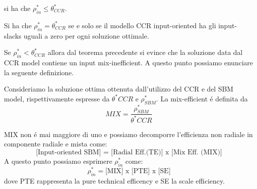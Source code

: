 si ha che $\rho^*_{in} \leq \theta^*_{CCR}$.

\begin{teor} Si ha che $\rho^*_{in} = \theta^*_{CCR}$ se e solo se il modello CCR input-oriented ha gli input-slacks uguali a zero per ogni soluzione ottimale. 
\end{teor}
\begin{oss} Se $\rho^*_{in} < \theta^*_{CCR}$ allora dal teorema precedente si evince che la soluzione data dal CCR model contiene un input mix-inefficient. A questo punto possiamo enunciare la seguente definizione.
\end{oss}
\begin{definiz} Consideriamo la soluzione ottima ottenuta dall'utilizzo del CCR e del SBM model, rispettivamente espresse da $\theta^*{CCR}$ e $\rho^*_{SBM}$. La mix-efficient \'e definita da
\begin{equation}
MIX = \frac{\rho^*_{SBM}}{\theta^*{CCR}}
\end{equation}
\end{definiz}
\begin{oss} MIX non \'e mai maggiore di uno e possiamo decomporre l'efficienza non radiale in componente radiale e mista come:
\begin{equation}
\text{[Input-oriented SBM] = [Radial Eff.(TE)] x [Mix Eff. (MIX)]}
\end{equation}
A questo punto possiamo esprimere $\rho^*_{in}$ come:
\begin{equation}
\rho^*_{in} = \text{[MIX] x [PTE] x [SE]}
\end{equation}
dove PTE rappresenta la pure technical efficency e SE la scale efficiency.
\end{oss}
